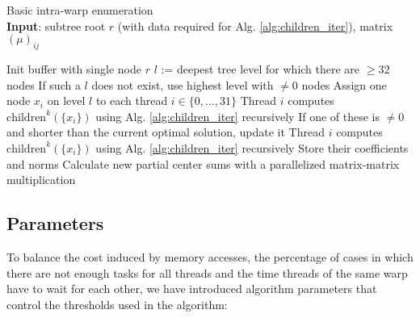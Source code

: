 \documentclass{scrartcl}
\begin{document}
    \begin{algorithm}[H]
        \caption{Basic intra-warp enumeration\label{alg:warp_enum}\\\textbf{Input}: subtree root $r$ (with data required for Alg. \ref{alg:children_iter}), matrix $(\mu)_{ij}$}
        \begin{algorithmic}
            \STATE Init buffer with single node $r$
                \STATE $l$ := deepest tree level for which there are $\geq 32$ nodes
                \STATE If such a $l$ does not exist, use highest level with $\neq 0$ nodes
                \STATE Assign one node $x_i$ on level $l$ to each thread $i \in \{0, ..., 31\}$
                    \STATE Thread $i$ computes $\mathrm{children}^k(\{x_i\})$ using Alg. \ref{alg:children_iter} recursively
                    \STATE If one of these is $\neq 0$ and shorter than the current optimal solution, update it
                \ELSE
                    \STATE Thread $i$ computes $\mathrm{children}^k(\{x_i\})$ using Alg. \ref{alg:children_iter} recursively
                    \STATE Store their coefficients and norms
                    \STATE Calculate new partial center sums with a parallelized matrix-matrix multiplication
                \ENDIF
                \ENDWHILE
        \end{algorithmic}
    \end{algorithm}

    \subsection{Parameters}

    To balance the cost induced by memory accesses, the percentage of cases in which there are not enough tasks for all threads and the time threads of the same warp have to wait for each other, we have introduced algorithm parameters that control the thresholds used in the algorithm:
    
\end{document}
